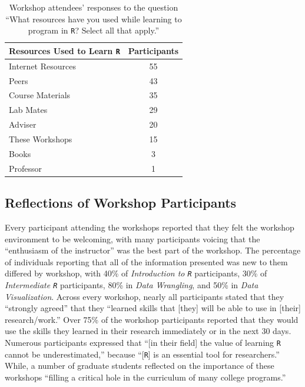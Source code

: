 \documentclass[12pt]{article}
\begin{document}
{
\begin{table}[h!]
    \centering
    \begin{tabular}{lc}
\hline
Resources Used to Learn \texttt{R} & Participants \\
\hline
Internet Resources & 55 \\
Peers & 43 \\
Course Materials & 35 \\
Lab Mates & 29  \\
Adviser	& 20 \\
These Workshops & 15 \\
Books & 3 \\
Professor & 1 \\
\hline
\end{tabular}
\caption{Workshop attendees' responses to the question ``What resources have you
used while learning to program in \texttt{R}? Select all that apply.''}
    \label{tab:resources}
\end{table}
}

\subsection{Reflections of Workshop Participants} 

\quad Every participant attending the workshops reported that they felt the
workshop environment to be welcoming, with many participants voicing that the
``enthusiasm of the instructor'' was the best part of the workshop. The
percentage of individuals reporting that all of the information presented was 
new to them differed by workshop, with 40\% of \emph{Introduction to \texttt{R}}
participants, 30\% of \emph{Intermediate \texttt{R}} participants, 80\% in 
\emph{Data Wrangling}, and 50\% in \emph{Data Visualization}. Across every
workshop, nearly all participants stated that they ``strongly agreed'' that they
``learned skills that [they] will be able to use in [their] research/work.'' 
Over 75\% of the workshop participants reported that they would use the skills
they learned in their research immediately or in the next 30 days. Numerous
participants expressed that ``[in their field] the value of learning \texttt{R}
cannot be underestimated,'' because ``[\texttt{R}] is an essential tool for
researchers.'' While, a number of graduate students reflected on the importance
of these workshops ``filling a critical hole in the curriculum of many college
programs.''
 
\end{document}

